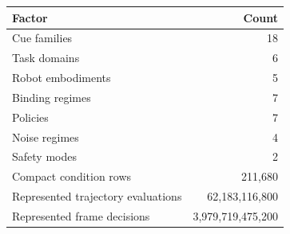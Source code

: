 \begin{tabular}{lr}
\toprule
Factor & Count \\
\midrule
Cue families & 18 \\
Task domains & 6 \\
Robot embodiments & 5 \\
Binding regimes & 7 \\
Policies & 7 \\
Noise regimes & 4 \\
Safety modes & 2 \\
Compact condition rows & 211,680 \\
Represented trajectory evaluations & 62,183,116,800 \\
Represented frame decisions & 3,979,719,475,200 \\
\bottomrule
\end{tabular}
